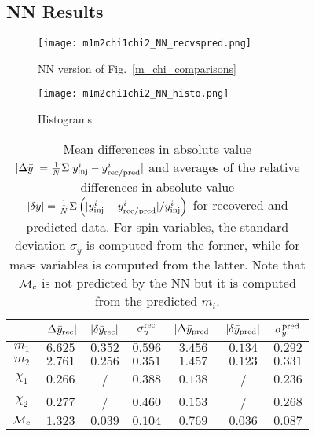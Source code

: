 \subsection{NN Results}

\begin{figure}
    \texttt{[image: m1m2chi1chi2\_NN\_recvspred.png]}
    \caption{NN version of Fig.~\ref{m_chi_comparisons}}
        \label{m1m2chi1chi2_NN_recvspred}
\end{figure}

\begin{figure}
    \centering
    \texttt{[image: m1m2chi1chi2\_NN\_histo.png]}
    \caption{Histograms}
        \label{m1m2chi1chi2_NN_histo}
\end{figure}

\begin{table} 
  \caption{\label{tab:NN_errors}  Mean differences in absolute value $|\Delta \bar{y}|=  \frac{1}{N} \Sigma |y^i_{\rm inj} - y^i_{\rm rec/pred}|$  
  and averages of the relative 
  differences in absolute value $|\delta \bar{y}| = \frac{1}{N} \Sigma \left( |y^i_{\rm inj} - y^i_{\rm rec/pred}|/y^i_{\rm inj} \right) $ for recovered and predicted data. 
  For spin variables, the standard deviation $\sigma_y$ is computed from the former, while for mass variables is computed from the latter. 
  Note that ${\cal{M}}_c$ is not predicted by the NN but it is computed from the predicted $m_i$.}
  \begin{center}
  \begin{tabular}{c|ccc|ccc}
  \hline\hline
  & $|\Delta \bar{y}_{\rm rec}|$  & $|\delta \bar{y}_{\rm rec}|$  & $\sigma_y^{\rm rec}$ & 
     $|\Delta \bar{y}_{\rm pred}|$ & $|\delta \bar{y}_{\rm pred}|$ & $\sigma_y^{\rm pred}$ \\
  \hline\hline
$m_1$          & $6.625$ & $0.352$ & $0.596$ & $3.456$ & $0.134$ & $0.292$ \\
$m_2$          & $2.761$ & $0.256$ & $0.351$ & $1.457$ & $0.123$ & $0.331$ \\
$\chi_1$       & $0.266$ &  /  & $0.388$ & $0.138$ &  /  & $0.236$ \\
$\chi_2$       & $0.277$ &  /  & $0.460$ & $0.153$ &  /  & $0.268$ \\
\hline
${\cal{M}}_c$  & $1.323$ & $0.039$ & $0.104$ & $0.769$ & $0.036$ & $0.087$ \\
  \hline\hline
\end{tabular}
\end{center}
\end{table}

